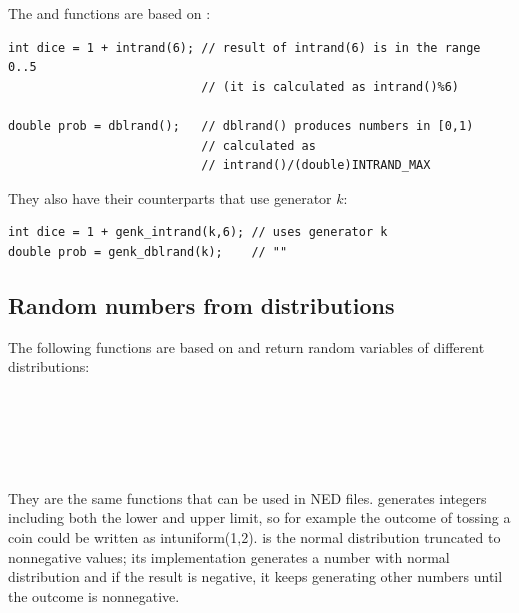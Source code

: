The  and  functions are based on :

\begin{Verbatim}
int dice = 1 + intrand(6); // result of intrand(6) is in the range 0..5
                           // (it is calculated as intrand()%6)

double prob = dblrand();   // dblrand() produces numbers in [0,1)
                           // calculated as
                           // intrand()/(double)INTRAND_MAX
\end{Verbatim}


They also have their counterparts that use generator $k$:

\begin{Verbatim}
int dice = 1 + genk_intrand(k,6); // uses generator k
double prob = genk_dblrand(k);    // ""
\end{Verbatim}




\subsection{Random numbers from distributions}



The following functions are based on  and return
random variables of different distributions:

\\
\\
\\
\\
\\


They are the same functions that can be used in NED files.
 generates integers including both the lower and
upper limit, so for example the outcome of tossing a coin could be
written as intuniform(1,2).   is the normal
distribution truncated to nonnegative values; its implementation
generates a number with normal distribution and if the result is
negative, it keeps generating other numbers until the outcome is
nonnegative.


